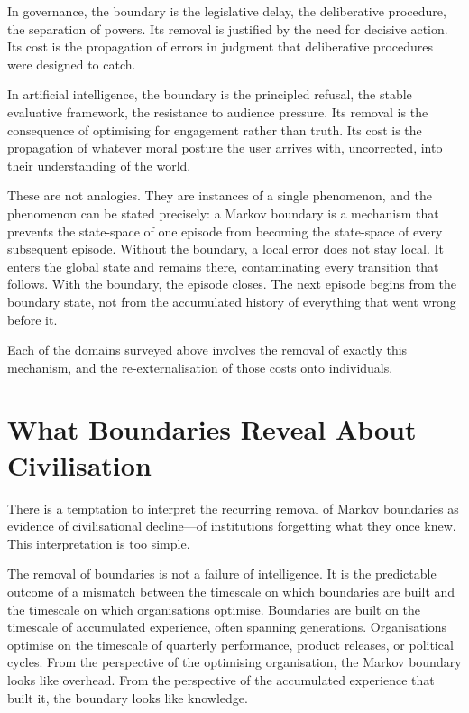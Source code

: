 \documentclass[12pt, a4paper]{article}
\begin{document}
In governance, the boundary is the legislative delay, the
deliberative procedure, the separation of powers. Its removal is
justified by the need for decisive action. Its cost is the
propagation of errors in judgment that deliberative procedures were
designed to catch.

In artificial intelligence, the boundary is the principled refusal,
the stable evaluative framework, the resistance to audience pressure.
Its removal is the consequence of optimising for engagement rather
than truth. Its cost is the propagation of whatever moral posture the
user arrives with, uncorrected, into their understanding of the world.

These are not analogies. They are instances of a single phenomenon,
and the phenomenon can be stated precisely: a Markov boundary is a
mechanism that prevents the state-space of one episode from becoming
the state-space of every subsequent episode. Without the boundary, a
local error does not stay local. It enters the global state and
remains there, contaminating every transition that follows. With the
boundary, the episode closes. The next episode begins from the
boundary state, not from the accumulated history of everything that
went wrong before it.

Each of the domains surveyed above involves the removal of exactly
this mechanism, and the re-externalisation of those costs onto
individuals.

\section{What Boundaries Reveal About Civilisation}

There is a temptation to interpret the recurring removal of Markov
boundaries as evidence of civilisational decline---of institutions
forgetting what they once knew. This interpretation is too simple.

The removal of boundaries is not a failure of intelligence. It is the
predictable outcome of a mismatch between the timescale on which
boundaries are built and the timescale on which organisations
optimise. Boundaries are built on the timescale of accumulated
experience, often spanning generations. Organisations optimise on
the timescale of quarterly performance, product releases, or
political cycles. From the perspective of the optimising organisation,
the Markov boundary looks like overhead. From the perspective of the
accumulated experience that built it, the boundary looks like
knowledge.
\end{document}

